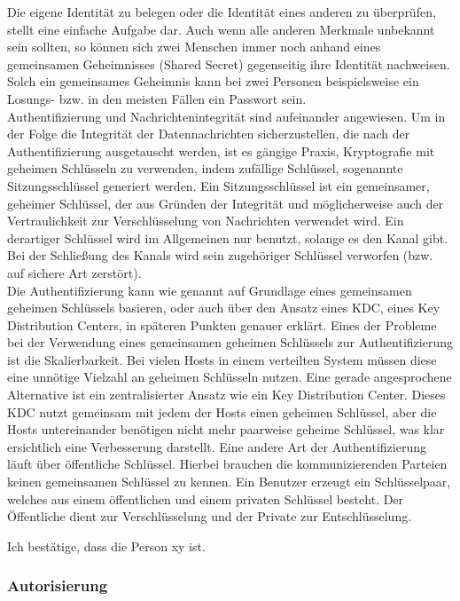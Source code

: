 \documentclass[letterpaper, 12pt]{article}
\let\tempsubsubsection\subsubsection
\renewcommand\subsubsection[1]{\vspace{0cm}\tempsubsubsection{#1}\vspace{0cm}}
\begin{document}
Die eigene Identität zu belegen oder die Identität eines anderen zu überprüfen, stellt eine einfache Aufgabe dar. Auch wenn alle anderen Merkmale unbekannt sein sollten, so können sich zwei Menschen immer noch anhand eines gemeinsamen Geheimnisses (Shared Secret) gegenseitig ihre Identität nachweisen. Solch ein gemeinsames Geheimnis kann bei zwei Personen beispielsweise ein Losungs- bzw. in den meisten Fällen ein Passwort sein. \\
Authentifizierung und Nachrichtenintegrität sind aufeinander angewiesen. Um in der Folge die Integrität der Datennachrichten sicherzustellen, die nach der Authentifizierung ausgetauscht werden, ist es gängige Praxis, Kryptografie mit geheimen Schlüsseln zu verwenden, indem zufällige Schlüssel, sogenannte Sitzungsschlüssel generiert werden. Ein Sitzungsschlüssel ist ein gemeinsamer, geheimer Schlüssel, der aus Gründen der Integrität und möglicherweise auch der Vertraulichkeit zur Verschlüsselung von Nachrichten verwendet wird. Ein derartiger Schlüssel wird im Allgemeinen nur benutzt, solange es den Kanal gibt. Bei der Schließung des Kanals wird sein zugehöriger Schlüssel verworfen (bzw. auf sichere Art zerstört). \\
Die Authentifizierung kann wie genannt auf Grundlage eines gemeinsamen geheimen Schlüssels basieren, oder auch über den Ansatz eines KDC, eines Key Distribution Centers, in späteren Punkten genauer erklärt. Eines der Probleme bei der Verwendung eines gemeinsamen geheimen Schlüssels zur Authentifizierung ist die Skalierbarkeit. Bei vielen Hosts in einem verteilten System müssen diese eine unnötige Vielzahl an geheimen Schlüsseln nutzen. Eine gerade angesprochene Alternative ist ein zentralisierter Ansatz wie ein Key Distribution Center. Dieses KDC nutzt gemeinsam mit jedem der Hosts einen geheimen Schlüssel, aber die Hosts untereinander benötigen nicht mehr paarweise geheime Schlüssel, was klar ersichtlich eine Verbesserung darstellt. \clearpage
Eine andere Art der Authentifizierung läuft über öffentliche Schlüssel. Hierbei brauchen die kommunizierenden Parteien keinen gemeinsamen Schlüssel zu kennen. Ein Benutzer erzeugt ein Schlüsselpaar, welches aus einem öffentlichen und einem privaten Schlüssel besteht. Der Öffentliche dient zur Verschlüsselung und der Private zur Entschlüsselung. \cite{ausarbeitungauth}

\begin{center}
	Ich bestätige, dass die Person xy ist.
\end{center}

\subsubsection{Autorisierung}
\end{document}
